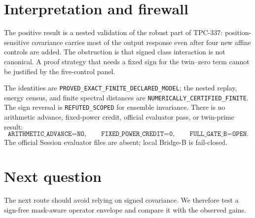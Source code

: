 \documentclass[10pt]{article}
\begin{document}
\section{Interpretation and firewall}

The positive result is a nested validation of the robust part of TPC-337:
position-sensitive covariance carries most of the output response even after
four new affine controls are added.  The obstruction is that signed class
interaction is not canonical.  A proof strategy that needs a fixed sign for
the twin--zero term cannot be justified by the five-control panel.

The identities are \texttt{PROVED\_EXACT\_FINITE\_DECLARED\_MODEL}; the
nested replay, energy census, and finite spectral distances are
\texttt{NUMERICALLY\_CERTIFIED\_FINITE}.  The sign reversal is
\texttt{REFUTED\_SCOPED} for ensemble invariance.  There is no arithmetic
advance, fixed-power credit, official evaluator pass, or twin-prime result:
\[
 \texttt{ARITHMETIC\_ADVANCE=NO},\qquad
 \texttt{FIXED\_POWER\_CREDIT=0},\qquad
 \texttt{FULL\_GATE\_B=OPEN}.
\]
The official Session evaluator files are absent; local Bridge-B is fail-closed.

\section{Next question}

The next route should avoid relying on signed covariance.  We therefore test a
sign-free mask-aware operator envelope and compare it with the observed gains.
\end{document}
